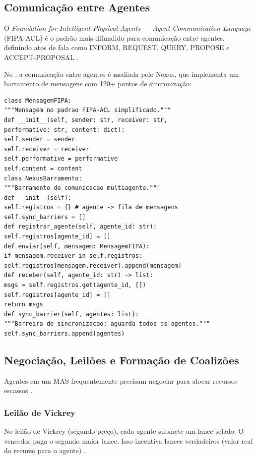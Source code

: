 \subsection{Comunicação entre Agentes}
\begin{definicao}
O \textit{Foundation for Intelligent Physical Agents --- Agent Communication
Language} (FIPA-ACL) é o padrão mais difundido para comunicação entre
agentes, definindo atos de fala como INFORM, REQUEST, QUERY, PROPOSE e
ACCEPT-PROPOSAL \cite{wooldridge2009multiagent}.
\end{definicao}
No \opencodeeco{}, a comunicação entre agentes é mediada pelo Nexus, que
implementa um barramento de mensagens com 120+ pontos de sincronização:
\begin{lstlisting}[style=pythonstyle]
class MensagemFIPA:
"""Mensagem no padrao FIPA-ACL simplificado."""
def __init__(self, sender: str, receiver: str,
performative: str, content: dict):
self.sender = sender
self.receiver = receiver
self.performative = performative
self.content = content
class NexusBarramento:
"""Barramento de comunicacao multiagente."""
def __init__(self):
self.registros = {} # agente -> fila de mensagens
self.sync_barriers = []
def registrar_agente(self, agente_id: str):
self.registros[agente_id] = []
def enviar(self, mensagem: MensagemFIPA):
if mensagem.receiver in self.registros:
self.registros[mensagem.receiver].append(mensagem)
def receber(self, agente_id: str) -> list:
msgs = self.registros.get(agente_id, [])
self.registros[agente_id] = []
return msgs
def sync_barrier(self, agentes: list):
"""Barreira de sincronizacao: aguarda todos os agentes."""
self.sync_barriers.append(agentes)
\end{lstlisting}
\subsection{Negociação, Leilões e Formação de Coalizões}
Agentes em um MAS frequentemente precisam negociar para alocar recursos
escassos \cite{weiss2013multiagent, shoham2023multiagent}.
\subsubsection*{Leilão de Vickrey}
No leilão de Vickrey (segundo-preço), cada agente submete um lance
selado. O vencedor paga o segundo maior lance. Isso incentiva lances
verdadeiros (valor real do recurso para o agente) \cite{shoham2023multiagent}.
